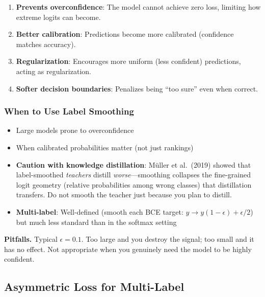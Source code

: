 \begin{enumerate}
    \item \textbf{Prevents overconfidence}: The model cannot achieve zero loss, limiting how extreme logits can become.

    \item \textbf{Better calibration}: Predictions become more calibrated (confidence matches accuracy).

    \item \textbf{Regularization}: Encourages more uniform (less confident) predictions, acting as regularization.

    \item \textbf{Softer decision boundaries}: Penalizes being ``too sure'' even when correct.
\end{enumerate}

\subsubsection{When to Use Label Smoothing}

\begin{itemize}
    \item Large models prone to overconfidence
    \item When calibrated probabilities matter (not just rankings)
    \item \textbf{Caution with knowledge distillation}: M\"uller et al.\ (2019) showed that label-smoothed \textit{teachers} distill \textit{worse}---smoothing collapses the fine-grained logit geometry (relative probabilities among wrong classes) that distillation transfers. Do not smooth the teacher just because you plan to distill.
    \item \textbf{Multi-label}: Well-defined (smooth each BCE target: $y \to y(1-\epsilon) + \epsilon/2$) but much less standard than in the softmax setting
\end{itemize}

\textbf{Pitfalls.} Typical $\epsilon = 0.1$. Too large and you destroy the signal; too small and it has no effect. Not appropriate when you genuinely need the model to be highly confident.

\subsection{Asymmetric Loss for Multi-Label}

